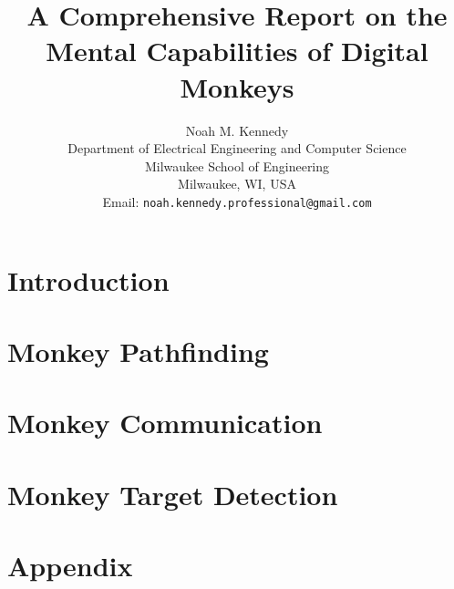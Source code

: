 \documentclass[11pt]{article}
\title{
    A Comprehensive Report on the Mental Capabilities of Digital Monkeys
}
\author{
    Noah M. Kennedy \\[3pt]
    {\small Department of Electrical Engineering and Computer Science} \\
    {\small Milwaukee School of Engineering} \\
    {\small Milwaukee, WI, USA} \\
    {\small Email: {\tt noah.kennedy.professional@gmail.com}} \\[12pt]
}
\date{}
\begin{document}
    \maketitle

    \abstract
    

    \newpage

    \tableofcontents

    \newpage

    \section{Introduction} \label{sec:intro}
    

    \section{Monkey Pathfinding}\label{sec:monkey-pathfinding}
    

    \section{Monkey Communication}\label{sec:monkey-communication}
    

    \section{Monkey Target Detection}\label{sec:monkey-target-detection}
    

    \section*{Appendix}\label{sec:appendix}

    \pagebreak

    \printbibliography
\end{document}
